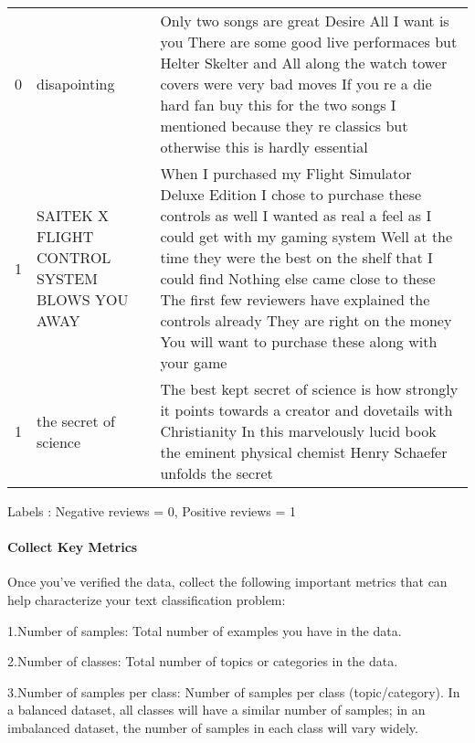 \documentclass[
]{article}
\newenvironment{Shaded}{}{}
\newcommand{\DecValTok}[1]{\textcolor[rgb]{0.25,0.63,0.44}{#1}}
\newcommand{\FunctionTok}[1]{\textcolor[rgb]{0.02,0.16,0.49}{#1}}
\newcommand{\NormalTok}[1]{#1}
\newcommand{\SpecialCharTok}[1]{\textcolor[rgb]{0.25,0.44,0.63}{#1}}
\begin{document}
\begin{table}[H]
\begin{tabular}[t]{rll}
0 & disapointing & Only two songs are great Desire All I want is you There are some good live performaces but Helter Skelter and All along the watch tower covers were very bad moves If you re a die hard fan buy this for the two songs I mentioned because they re classics but otherwise this is hardly essential\\
1 & SAITEK X FLIGHT CONTROL SYSTEM BLOWS YOU AWAY & When I purchased my Flight Simulator Deluxe Edition I chose to purchase these controls as well I wanted as real a feel as I could get with my gaming system Well at the time they were the best on the shelf that I could find Nothing else came close to these The first few reviewers have explained the controls already They are right on the money You will want to purchase these along with your game\\
1 & the secret of science & The best kept secret of science is how strongly it points towards a creator and dovetails with Christianity In this marvelously lucid book the eminent physical chemist Henry Schaefer unfolds the secret\\
\bottomrule
\end{tabular}
\end{table}

Labels : Negative reviews = 0, Positive reviews = 1

\begin{Shaded}
\end{Shaded}

\newpage

\hypertarget{collect-key-metrics}{%
\paragraph{Collect Key Metrics}\label{collect-key-metrics}}

Once you've verified the data, collect the following important metrics
that can help characterize your text classification problem:

1.Number of samples: Total number of examples you have in the data.

2.Number of classes: Total number of topics or categories in the data.

3.Number of samples per class: Number of samples per class
(topic/category). In a balanced dataset, all classes will have a similar
number of samples; in an imbalanced dataset, the number of samples in
each class will vary widely.
\end{document}

